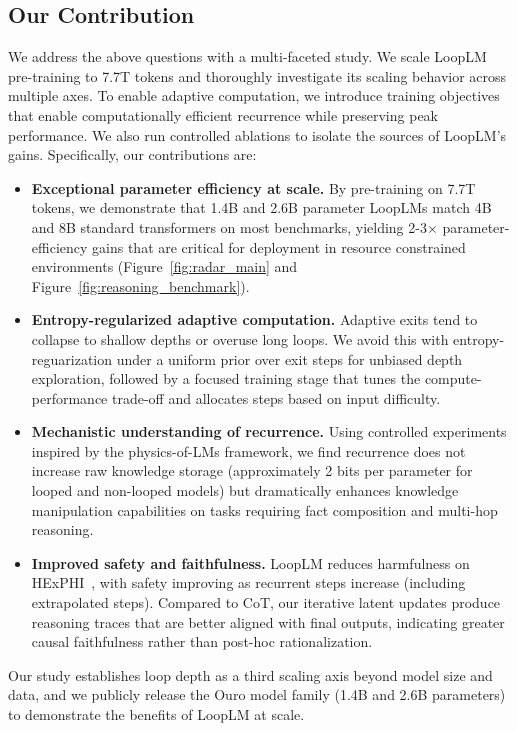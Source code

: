 \documentclass[]{bytedance_seed}
\newcommand{\1}{\mathbf{1}}
\newcommand{\ut}{LoopLM}
\begin{document}
\subsection*{Our Contribution}

We address the above questions with a multi-faceted study. We scale \ut{} pre-training to 7.7T tokens and thoroughly investigate its scaling behavior across multiple axes. To enable adaptive computation, we introduce training objectives that enable computationally efficient recurrence  while preserving peak performance. We also run controlled ablations to isolate the sources of \ut{}'s gains. Specifically, our contributions are:
\begin{itemize}
\item \textbf{Exceptional parameter efficiency at scale.} By pre-training on 7.7T tokens, we demonstrate that 1.4B and 2.6B parameter \ut{}s match 4B and 8B standard transformers on most benchmarks, yielding 2-3$\times$ parameter-efficiency gains that are critical for deployment in resource constrained environments (Figure~\ref{fig:radar_main} and Figure~\ref{fig:reasoning_benchmark}).
\item \textbf{Entropy-regularized adaptive computation.} Adaptive exits tend to collapse to shallow depths or overuse long loops. We avoid this with entropy-reguarization under a uniform prior over exit steps for unbiased depth exploration, followed by a focused training stage that tunes the compute-performance trade-off and allocates steps based on input difficulty.
\item \textbf{Mechanistic understanding of recurrence.} Using controlled experiments inspired by the physics-of-LMs framework, we find recurrence does not increase raw knowledge storage (approximately 2 bits per parameter for looped and non-looped models) but dramatically enhances knowledge manipulation capabilities on tasks requiring fact composition and multi-hop reasoning.
\item \textbf{Improved safety and faithfulness.} \ut{} reduces harmfulness on HEx\text{-}PHI~\citep{qifine}, with safety improving as recurrent steps increase (including extrapolated steps). Compared to CoT, our iterative latent updates produce reasoning traces that are better aligned with final outputs, indicating greater causal faithfulness rather than post-hoc rationalization.
\end{itemize}


Our study establishes loop depth as a third scaling axis beyond model size and data, and we publicly release the Ouro model family (1.4B and 2.6B parameters) to demonstrate the benefits of \ut{} at scale.
\end{document}
